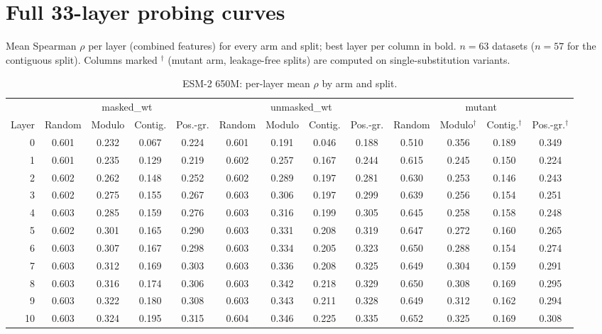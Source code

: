 \documentclass[11pt,a4paper]{article}
\begin{document}
\section*{Full 33-layer probing curves}
Mean Spearman $\rho$ per layer (combined features) for every arm and split; best layer per
column in bold. $n = 63$ datasets ($n = 57$ for the contiguous split). Columns marked
$^{\dagger}$ (mutant arm, leakage-free splits) are computed on single-substitution variants.
\begin{landscape}\begin{table}[p]\centering\footnotesize
\caption{ESM-2 650M: per-layer mean $\rho$ by arm and split.}\label{tab:S5}
\begin{tabular}{rcccccccccccc}
\toprule
& \multicolumn{4}{c}{masked\_wt} & \multicolumn{4}{c}{unmasked\_wt} & \multicolumn{4}{c}{mutant} \\
\cmidrule(lr){2-5}\cmidrule(lr){6-9}\cmidrule(lr){10-13}
Layer & Random & Modulo & Contig. & Pos.-gr. & Random & Modulo & Contig. & Pos.-gr. & Random & Modulo$^{\dagger}$ & Contig.$^{\dagger}$ & Pos.-gr.$^{\dagger}$ \\
\midrule
0 & 0.601 & 0.232 & 0.067 & 0.224 & 0.601 & 0.191 & 0.046 & 0.188 & 0.510 & 0.356 & 0.189 & 0.349 \\
1 & 0.601 & 0.235 & 0.129 & 0.219 & 0.602 & 0.257 & 0.167 & 0.244 & 0.615 & 0.245 & 0.150 & 0.224 \\
2 & 0.602 & 0.262 & 0.148 & 0.252 & 0.602 & 0.289 & 0.197 & 0.281 & 0.630 & 0.253 & 0.146 & 0.243 \\
3 & 0.602 & 0.275 & 0.155 & 0.267 & 0.603 & 0.306 & 0.197 & 0.299 & 0.639 & 0.256 & 0.154 & 0.251 \\
4 & 0.603 & 0.285 & 0.159 & 0.276 & 0.603 & 0.316 & 0.199 & 0.305 & 0.645 & 0.258 & 0.158 & 0.248 \\
5 & 0.602 & 0.301 & 0.165 & 0.290 & 0.603 & 0.331 & 0.208 & 0.319 & 0.647 & 0.272 & 0.160 & 0.265 \\
6 & 0.603 & 0.307 & 0.167 & 0.298 & 0.603 & 0.334 & 0.205 & 0.323 & 0.650 & 0.288 & 0.154 & 0.274 \\
7 & 0.603 & 0.312 & 0.169 & 0.303 & 0.603 & 0.336 & 0.208 & 0.325 & 0.649 & 0.304 & 0.159 & 0.291 \\
\midrule
8 & 0.603 & 0.316 & 0.174 & 0.306 & 0.603 & 0.342 & 0.218 & 0.329 & 0.650 & 0.308 & 0.169 & 0.295 \\
9 & 0.603 & 0.322 & 0.180 & 0.308 & 0.603 & 0.343 & 0.211 & 0.328 & 0.649 & 0.312 & 0.162 & 0.294 \\
10 & 0.603 & 0.324 & 0.195 & 0.315 & 0.604 & 0.346 & 0.225 & 0.335 & 0.652 & 0.325 & 0.169 & 0.308 \\

\end{tabular}
\end{table}
\end{landscape}
\end{document}
